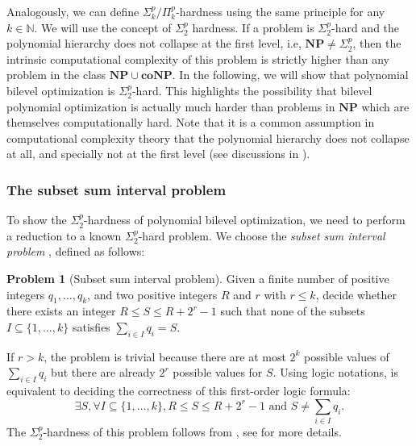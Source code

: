 \documentclass{article}
\newcommand*{\N}{\mathbb{N}}
\newcommand{\existleveltwo}{\Sigma_2^p}
\theoremstyle{plain}
\theoremstyle{definition}
\newtheorem{problem}[theorem]{Problem}
\begin{document}
Analogously, we can define $\Sigma_k^p/\Pi_k^p$-hardness using the same principle for any $k \in \N$. We will use the concept of $\Sigma_2^p$ hardness. If a problem is $\Sigma_2^p$-hard and the polynomial hierarchy does not collapse at the first level, i.e, $\mathbf{NP} \neq \Sigma_{2}^p$, then the intrinsic computational complexity of this problem is strictly higher than any problem in the class $\mathbf{NP} \cup \mathbf{coNP}$. In the following, we will show that polynomial bilevel optimization is $\existleveltwo$-hard. This highlights the possibility that bilevel polynomial optimization is actually much harder than problems in $\mathbf{NP}$ which are themselves computationally hard. Note that it is a common assumption in computational complexity theory that the polynomial hierarchy does not collapse at all, and specially not at the first level (see discussions in \cite[Section 5.2.1]{arora2009computational}).

\subsubsection*{The subset sum interval problem}
To show the $\existleveltwo$-hardness of polynomial bilevel optimization, we need to perform a reduction to a known $\existleveltwo$-hard problem. We choose the \emph{subset sum interval problem} \cite{caprara2014study}, defined as follows:
\begin{problem}[Subset sum interval problem]
    \label{prob:subset-sum-interval}
    Given a finite number of positive integers $q_1, \ldots, q_k$, and two positive integers $R$ and $r$ with $r \leq k$, decide whether there exists an integer $R \leq S \leq R + 2^r - 1$ such that none of the subsets $I \subseteq \{1, \ldots, k\}$ satisfies $\sum_{i \in I}q_i = S$.  
\end{problem}

If $r > k$, the problem is trivial because there are at most $2^k$ possible values of $\sum_{i \in I} q_i$ but there are already $2^r$ possible values for $S$. Using logic notations,  is equivalent to deciding the correctness of this first-order logic formula:
\begin{equation*}
    \exists S, \forall I \subseteq \{1, \ldots, k\}, R \leq S \leq R + 2^r - 1 \text{ and } S \neq \sum_{i \in I} q_i.
\end{equation*}
The $\existleveltwo$-hardness of this problem follows from \cite{eggermont2012motion}, see  for more details.
\end{document}
